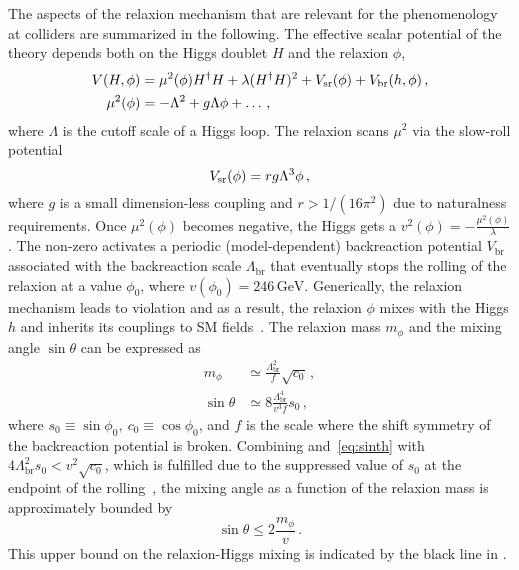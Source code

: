 The aspects of the relaxion mechanism that are relevant for the phenomenology at colliders are summarized in the following.
The effective scalar potential of
the theory depends both on the Higgs doublet $H$ and the relaxion $\phi$,
\begin{align}
  V(H,\phi)&=\mu^2(\phi) H^\dagger H+\lambda (H^ \dagger H)^2 + V_{\rm sr}(\phi)+ V_\text{br}(h,\phi)\, ,\label{eq:pot}\\
  \mu^2(\phi)&=-\Lambda^2+g \Lambda \phi + \dots   \, ,
\label{eq:mu2}
\end{align}
where $\Lambda$ is the cutoff scale of a Higgs loop.
The relaxion scans $\mu^2$ via the slow-roll potential
\begin{equation}
  V_{\rm sr}(\phi)=r g\Lambda^3 \phi\,,
\label{eq:roll}
\end{equation}
where $g$ is a small dimension-less coupling and $r > 1/ (16 \pi^2)$ due to naturalness
requirements. Once $\mu^2(\phi)$ becomes negative, the Higgs gets a \vev
$v^2(\phi)=-\frac{\mu^2(\phi)}{\lambda}$. The non-zero \vev activates a periodic (model-dependent)
backreaction potential $V_\text{br}$ associated with the backreaction scale $\Lambda_{\textrm{br} }$ that eventually
stops the rolling of the relaxion at a value $\phi_0$, where $v(\phi_0)=246\,\textrm{GeV}$.  Generically, the
relaxion mechanism leads to \cp violation and as a result, the relaxion $\phi$ mixes with the
Higgs $h$ and inherits its couplings to SM fields~\cite{Flacke:2016szy,Choi:2016luu}.  The relaxion
mass $m_{\phi}$ and the mixing angle $\sin\theta$ can be expressed as
\begin{align}
m_{\phi} &\simeq \frac{ \Lambda_{\textrm{br} }^2}{f} \sqrt{c_0 }\,,
\label{eq:mphiApprox}\\
\sin{\theta}
 &\simeq 8   \frac{\Lambda_{\textrm{br} }^4}{v^3 f} s_0 \,,
\label{eq:sinth}
\end{align}
where $s_0\equiv \sin\phi_0, ~c_0\equiv \cos\phi_0$, and $f$ is the scale where the shift symmetry of the backreaction potential
is broken. Combining  and~\eqref{eq:sinth} with
$4 \Lambda_{\textrm{br} }^2 s_0 < v^2\sqrt{c_0}$, which is fulfilled due to the suppressed value of $s_0$ at the endpoint of
the rolling~\cite{Choi:2016luu}, the mixing angle as a function of the relaxion mass is
approximately bounded by
\begin{equation}
 \sin\theta \leq 2\frac{m_{\phi}}{v}\,.
 \label{eq:maxmixNatural}
\end{equation}
This upper bound on the relaxion-Higgs mixing is indicated by the black line in .

